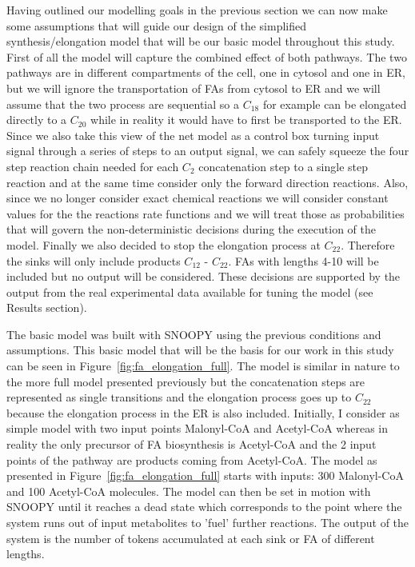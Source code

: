 Having outlined our modelling goals in the previous section we can now
make some assumptions that will guide our design of the simplified
synthesis/elongation model that will be our basic model throughout
this study. First of all the model will capture the combined effect of
both pathways. The two pathways are in different compartments of
the cell, one in cytosol and one in ER, but we will ignore the
transportation of FAs from cytosol to ER and we will assume that the
two process are sequential so a $C_{18}$ for example can be elongated
directly to a $C_{20}$ while in reality it would have to first be
transported to the ER. Since we also take this view of the
net model as a control box turning input signal through a series of
steps to an output signal, we can safely squeeze the four step reaction chain
needed for each $C_2$ concatenation step to a single step reaction and
at the same time consider only the forward direction
reactions. Also, since we no longer consider exact chemical
reactions we will consider constant values for the the reactions rate
functions and we will treat those as probabilities that will govern the
non-deterministic decisions during the execution of the model. Finally we
also decided to stop the elongation process at $C_{22}$. Therefore the
sinks will only include products $C_{12}$ - $C_{22}$. FAs with lengths
4-10 will be included but no output will be considered. These
decisions are supported by the output from the real experimental data available
for tuning the model (see
Results section).

The basic model was built with SNOOPY \cite [] {heiner2012snoopy} using the previous conditions and assumptions. This basic model that will
be the basis for our work in this study can be seen in
Figure~\ref{fig:fa_elongation_full}. The model is similar in nature to
the more full model presented previously but the concatenation steps
are represented as single transitions and the elongation process goes
up to $C_{22}$ because the elongation process in the ER is also
included. Initially, I consider as simple model with two input points Malonyl-CoA
and Acetyl-CoA whereas in reality the only precursor of FA
biosynthesis is Acetyl-CoA and the 2 input points of the pathway are
products coming from Acetyl-CoA. The model as presented in
Figure~\ref{fig:fa_elongation_full} starts with inputs: 300
Malonyl-CoA and 100 Acetyl-CoA molecules. The model can then be set in
motion with SNOOPY until it reaches a dead state which
corresponds to the point where the system runs out of input
metabolites to 'fuel' further reactions. The output of the system
is the number of tokens accumulated at each sink or FA of
different lengths.


